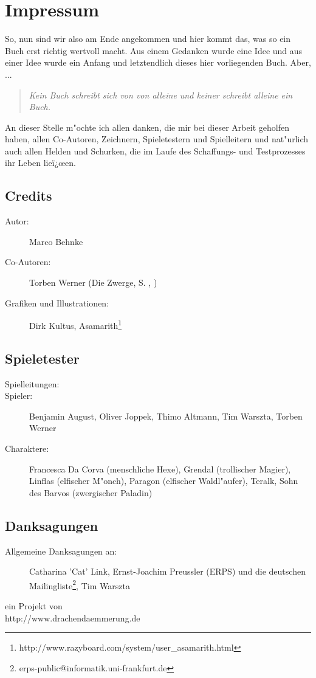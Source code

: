 \chapter{Impressum}
\par So, nun sind wir also am Ende angekommen und hier kommt das, was so ein Buch erst richtig wertvoll macht. Aus einem Gedanken wurde eine Idee und aus einer Idee wurde ein Anfang und letztendlich dieses hier vorliegenden Buch. Aber, ...
\begin{quotation}
\par \textit{\glqq Kein Buch schreibt sich von von alleine und keiner schreibt alleine ein Buch.\grqq}
\end{quotation}
\par An dieser Stelle m"ochte ich allen danken, die mir bei dieser Arbeit geholfen haben, allen Co-Autoren,
Zeichnern, Spieletestern und Spielleitern und nat"urlich auch allen Helden und Schurken, die im Laufe des
Schaffungs- und Testprozesses ihr Leben lieï¿œen.
\begin{center}
\section*{Credits}
\begin{description}
\item[Autor:]Marco Behnke
\item[Co-Autoren:] Torben Werner (Die Zwerge, S. \pageref{zwerge}, \pageref{diezwerge})
\item[Grafiken und Illustrationen:] Dirk Kultus, \glqq Asamarith\grqq{}\footnote{http://www.razyboard.com/system/user\_asamarith.html}
\end{description}

\section*{Spieletester}
\begin{description}
\item[Spielleitungen:]
\item[Spieler:] Benjamin August, Oliver Joppek, Thimo Altmann, Tim Warszta, Torben Werner
\item[Charaktere:] Francesca Da Corva (menschliche Hexe), Grendal (trollischer Magier), Linflas (elfischer M"onch), Paragon (elfischer Waldl"aufer), Teralk, Sohn des Barvos (zwergischer Paladin)
\end{description}

\section*{Danksagungen}
\begin{description}
\item[Allgemeine Danksagungen an:] Catharina 'Cat' Link, Ernst-Joachim
Preussler (ERPS) und die deutschen Mailingliste\footnote{erps-public@informatik.uni-frankfurt.de}, Tim Warszta
\end{description}
\end{center}

\newpage
\begin{center}
\end{center}
\begin{center}
ein Projekt von\\
http://www.drachendaemmerung.de
\end{center}
\begin{center}
\end{center}
